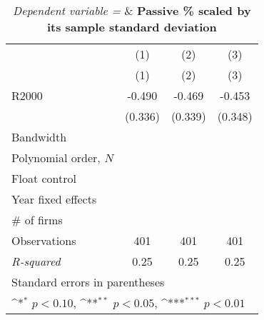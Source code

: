 \begin{table}[htbp]\centering
\def\sym#1{\ifmmode^{#1}\else\(^{#1}\)\fi}
\caption{\textit{Dependent variable =} & \textbf{Passive \% scaled by its sample standard deviation}}
\begin{tabular}{l*{3}{c}}
\toprule
                    &\multicolumn{1}{c}{(1)}&\multicolumn{1}{c}{(2)}&\multicolumn{1}{c}{(3)}\\
                    &\multicolumn{1}{c}{(1)}&\multicolumn{1}{c}{(2)}&\multicolumn{1}{c}{(3)}\\
\midrule
R2000               &      -0.490         &      -0.469         &      -0.453         \\
                    &     (0.336)         &     (0.339)         &     (0.348)         \\
\midrule
Bandwidth           &                     &                     &                     \\
Polynomial order, \(N\)&                     &                     &                     \\
Float control       &                     &                     &                     \\
Year fixed effects  &                     &                     &                     \\
# of firms          &                     &                     &                     \\
Observations        &         401         &         401         &         401         \\
\textit{R-squared}  &        0.25         &        0.25         &        0.25         \\
\bottomrule
\multicolumn{4}{l}{\footnotesize Standard errors in parentheses}\\
\multicolumn{4}{l}{\footnotesize \sym{*} \(p<0.10\), \sym{**} \(p<0.05\), \sym{***} \(p<0.01\)}\\
\end{tabular}
\end{table}
